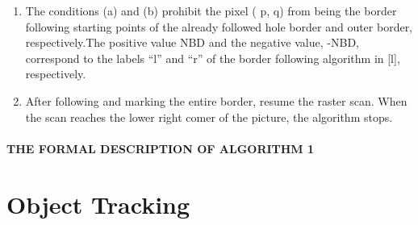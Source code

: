 \documentclass[a4paper,12pt]{book}%
\begin{document}
\begin{enumerate}
	\item The conditions (a) and (b) prohibit the pixel ( p, q) from being the border following	starting points of the already followed hole border and outer border, respectively.The positive value NBD and the negative value, -NBD, correspond to the labels
``l'' and ``r'' of the border following algorithm in [l], respectively.
	\item After following and marking the entire border, resume the raster scan. When the	scan reaches the lower right comer of the picture, the algorithm stops.
\end{enumerate}


\paragraph{THE FORMAL DESCRIPTION OF ALGORITHM 1}


\section{Object Tracking}






\end{document}
